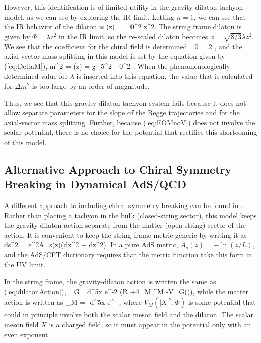 However, this identification is of limited utility in the gravity-dilaton-tachyon model, as we can see by exploring the IR limit.
Letting $n=1$, we can see that the IR behavior of the dilaton is 
\be
\phi(z) = \chi_0^2 z^2.
\ee
The string frame dilaton is given by $\Phi = \lambda z^2$ in the IR limit, so the re-scaled dilaton becomes $\phi = \sqrt{8/3}\lambda z^2$.
We see that the coefficient for the chiral field is determined
\be
\chi_0 = 2 \sqrt{\lambda},
\ee
and the axial-vector mass splitting in this model is set by the equation given by (\ref{eq:DeltaM}),
\be
\Delta m^2 = (z\rightarrow \infty) = g_5^2 \chi_0^2 .
\ee
When the phenomenologically determined value for $\lambda$ is inserted into this equation, the value that is calculated for $\Delta m^2$ is too large by an order of magnitude. 

Thus, we see that this gravity-dilaton-tachyon system fails because it does not allow separate parameters for the slope of the Regge trajectories and for the axial-vector mass splitting.
Further, because (\ref{eq:EOMnoV}) does not involve the scalar potential, there is no choice for the potential that rectifies this shortcoming of this model. 

\subsection{Alternative Approach to Chiral Symmetry Breaking in Dynamical AdS/QCD}

A different approach to including chiral symmetry breaking can be found in \cite{Li2013,Li2013a}. 
Rather than placing a tachyon in the bulk (closed-string sector), this model keeps the gravity-dilaton action separate from the matter (open-string) sector of the action.
It is convenient to keep the string frame metric generic by writing it as 
\be
ds^2 = e^{2A_s(z)}(dx^2 + dz^2).
\ee
In a pure AdS metric, $A_s(z)=-\ln(z/L)$, and the AdS/CFT dictionary requires that the metric function take this form in the UV limit.

In the string frame, the gravity-dilaton action is written the same as (\ref{eq:dilatonAction}),
\be
{}_G=  \int d^5x \root e^{-2\Phi} \left(R +4\partial_M \Phi \partial^M \Phi -V_G(\Phi)\right), 
\label{eq:altGravAction}
\ee
while the matter action is written as
\be
{}_M  = -\int d^5x \root e^{-\Phi}  ,
\label{eq:altMatterAction}
\ee
where $V_M(|X|^2,\Phi)$ is some potential that could in principle involve both the scalar meson field and the dilaton.
The scalar meson field $X$ is a charged field, so it must  appear in the potential only with an even exponent.

